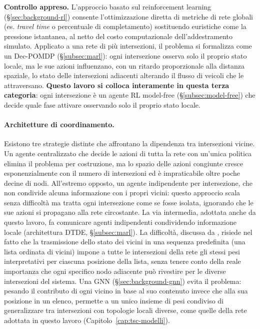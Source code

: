 \textbf{Controllo appreso.} L'approccio basato sul reinforcement learning
(§\ref{sec:background-rl}) consente l'ottimizzazione diretta di metriche
di rete globali (es. \emph{travel time} o percentuale di completamento)
sostituendo euristiche come la pressione istantanea, al netto del costo
computazionale dell'addestramento simulato. Applicato a una rete di più
intersezioni, il problema si formalizza come un Dec-POMDP
(§\ref{subsec:marl}): ogni intersezione osserva solo il proprio stato
locale, ma le sue azioni influenzano, con un ritardo proporzionale alla
distanza spaziale, lo stato delle intersezioni adiacenti alterando il
flusso di veicoli che le attraversano. \textbf{Questo lavoro si colloca
interamente in questa terza categoria}: ogni intersezione è un agente RL
model-free (§\ref{subsec:model-free}) che decide quale fase attivare
osservando solo il proprio stato locale.

\paragraph{Architetture di coordinamento.} Esistono tre strategie distinte
che affrontano la dipendenza tra intersezioni vicine. Un agente
centralizzato che decide le azioni di tutta la rete con un'unica politica
elimina il problema per costruzione, ma lo spazio delle azioni congiunte
cresce esponenzialmente con il numero di intersezioni ed è impraticabile
oltre poche decine di nodi. All'estremo opposto, un agente indipendente
per intersezione, che non condivide alcuna informazione con i propri
vicini: questo approccio scala senza difficoltà ma tratta ogni
intersezione come se fosse isolata, ignorando che le sue azioni si
propagano alla rete circostante. La via intermedia, adottata anche da
questo lavoro, fa comunicare agenti indipendenti condividendo informazione
locale (architettura DTDE, §\ref{subsec:marl}). La difficoltà, discussa da
\citet{wei2019colight}, risiede nel fatto che la trasmissione dello stato
dei vicini in una sequenza predefinita (una lista ordinata di vicini)
impone a tutte le intersezioni della rete gli stessi pesi interpretativi
per ciascuna posizione della lista, senza tenere conto della reale
importanza che ogni specifico nodo adiacente può rivestire per le diverse
intersezioni del sistema. Una GNN (§\ref{sec:background-gnn}) evita il
problema: pesando il contributo di ogni vicino in base al suo contenuto
invece che alla sua posizione in un elenco, permette a un unico insieme di
pesi condiviso di generalizzare tra intersezioni con topologie locali
diverse, come quelle della rete adottata in questo lavoro
(Capitolo~\ref{cap:tsc-modelli}).

